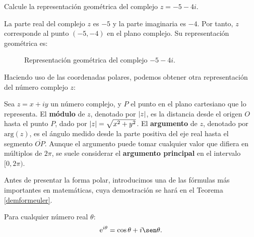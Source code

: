 \begin{prob} Calcule la representación geométrica del complejo $z=-5-4i.$ \label{formageometrica54i}
\begin{myproof} 
La parte real del complejo $z$ es $-5$ y la parte imaginaria es $-4$. Por tanto, $z$ corresponde al punto $(-5,-4)$ en el plano complejo. Su representación geométrica es:

\begin{figure}[H]
\centering
{}
\caption{Representación geométrica del complejo $-5-4i.$}
\end{figure}
\end{myproof}
\end{prob} 

Haciendo uso de las coordenadas polares, podemos obtener otra representación del número complejo $z$:

\begin{definition}\label{modnumcom}
Sea $z=x+iy$ un número complejo, y $P$ el punto en el plano cartesiano que lo representa. El \textbf{módulo} de $z$, denotado por $\left\vert z\right\vert$, es la distancia desde el origen $O$ hasta el punto $P$, dado por $\left\vert z\right\vert=\sqrt{x^2+y^2}$. El \textbf{argumento} de $z$, denotado por $\text{arg}(z)$, es el ángulo medido desde la parte positiva del eje real hasta el segmento $\overline{OP}$. Aunque el argumento puede tomar cualquier valor que difiera en múltiplos de $2\pi$, se suele considerar el \textbf{argumento principal} en el intervalo $[0,2\pi)$.
\end{definition}

Antes de presentar la forma polar, introducimos una de las fórmulas más importantes en matemáticas, cuya demostración se hará en el Teorema \ref{demformeuler}.

\begin{theorem}\label{formeuler} Para cualquier número real $\theta$:
$$\mathrm{e}^{i\theta}=\cos \theta + i \sen \theta.$$
\end{theorem}

